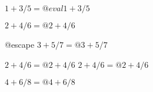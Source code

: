 


$1+3/5 = @eval{1+3/5}$


$2+4/6 = @{2+4/6}$

@escape{%
$3+5/7 = @{3+5/7}$
}%

$2+4/6 = @{2+4/6}$
$2+4/6 = @{2+4/6}{}$




$4+6/8 = @{4+6/8}$


